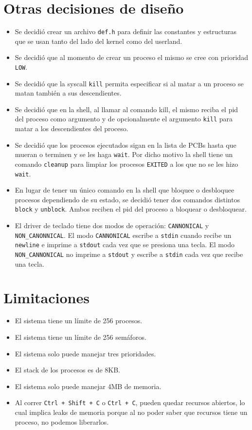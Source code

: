 \documentclass{article}
\begin{document}
\section {Otras decisiones de diseño}
\begin{itemize}
    \item Se decidió crear un archivo \texttt{\texttt{def.h}} para definir las constantes y estructuras que se usan tanto del lado del kernel como del userland.
    \item Se decidió que al momento de crear un proceso el mismo se cree con prioridad \texttt{LOW}.
    \item Se decidió que la syscall \texttt{kill} permita especificar si al matar a un proceso se matan también a sus descendientes.
    \item Se decidió que en la shell, al llamar al comando kill, el mismo reciba el pid del proceso como argumento y de opcionalmente el argumento \texttt{kill} para matar a los descendientes del proceso.
    \item Se decidió que los procesos ejecutados sigan en la lista de PCBs hasta que mueran o terminen y se les haga \texttt{wait}. Por dicho motivo la shell tiene un comando \texttt{cleanup} para limpiar los procesos \texttt{EXITED} a los que no se les hizo \texttt{wait}.\item En lugar de tener un único comando en la shell que bloquee o desbloquee procesos dependiendo de su estado, se decidió tener dos comandos distintos \texttt{block} y \texttt{unblock}. Ambos reciben el pid del proceso a bloquear o desbloquear.
    \item El driver de teclado tiene dos modos de operación: \texttt{CANNONICAL} y \texttt{NON\_CANONNICAL}. El modo \texttt{CANNONICAL} escribe a \texttt{stdin} cuando recibe un \texttt{newline} e imprime a \texttt{stdout} cada vez que se presiona una tecla. El modo \texttt{NON\_CANNONICAL} no imprime a \texttt{stdout} y escribe a \texttt{stdin} cada vez que recibe una tecla.
\end{itemize}

\section {Limitaciones}
\begin{itemize}
    \item El sistema tiene un límite de 256 procesos.
    \item El sistema tiene un límite de 256 semáforos.
    \item El sistema solo puede manejar tres prioridades.
    \item El stack de los procesos es de 8KB.
    \item El sistema solo puede manejar 4MB de memoria.
    \item Al correr \texttt{Ctrl + Shift + C} o \texttt{Ctrl + C}, pueden quedar recursos abiertos, lo cual implica leaks de memoria porque al no poder saber que recursos tiene un proceso, no podemos liberarlos.
\end{itemize}
\end{document}
